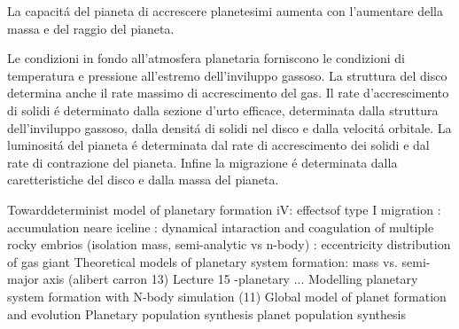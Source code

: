 La capacit\'a del pianeta di accrescere planetesimi aumenta con l'aumentare della massa e del raggio del pianeta.

\begin{errata}
	Le condizioni in fondo all'atmosfera planetaria forniscono le condizioni di temperatura e pressione all'estremo dell'inviluppo gassoso. La struttura del disco determina anche il rate massimo di accrescimento del gas. Il rate d'accrescimento di solidi \'e determinato dalla sezione d'urto efficace, determinata dalla struttura dell'inviluppo gassoso, dalla densit\'a di solidi nel disco e dalla velocit\'a orbitale. La luminosit\'a del pianeta \'e determinata dal rate di accrescimento dei solidi e dal rate di contrazione del pianeta. Infine la migrazione \'e determinata dalla caretteristiche del disco e dalla massa del pianeta.
\end{errata}

\begin{workout}
	Towarddeterminist model of planetary formation iV: effectsof type I migration
	: accumulation neare iceline
	: dynamical intaraction and coagulation of multiple rocky embrios (isolation mass, semi-analytic vs n-body)
	: eccentricity distribution of gas giant
	Theoretical models of planetary system formation: mass vs. semi-major axis	(alibert carron 13)			Lecture 15 -planetary ...
	Modelling planetary system formation with N-body simulation (11)
	Global model of planet formation and evolution
	Planetary population synthesis
	planet population synthesis					
\end{workout}

